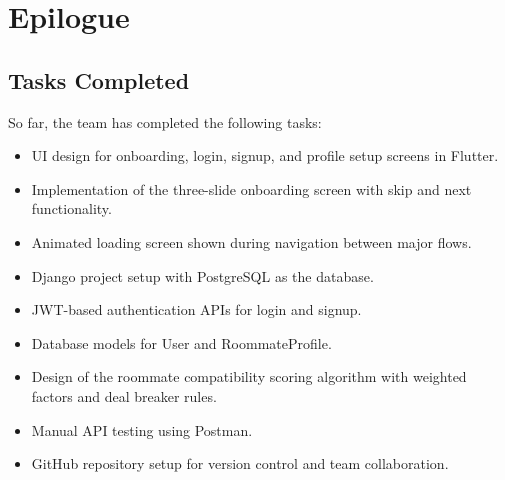 \chapter{Epilogue}

\section{Tasks Completed}
So far, the team has completed the following tasks:
\begin{itemize}
\item UI design for onboarding, login, signup, and profile setup screens in Flutter.
\item Implementation of the three-slide onboarding screen with skip and next functionality.
\item Animated loading screen shown during navigation between major flows.
\item Django project setup with PostgreSQL as the database.
\item JWT-based authentication APIs for login and signup.
\item Database models for User and RoommateProfile.
\item Design of the roommate compatibility scoring algorithm with weighted factors and deal breaker rules.

\item Manual API testing using Postman.
\item GitHub repository setup for version control and team collaboration.
\end{itemize}

